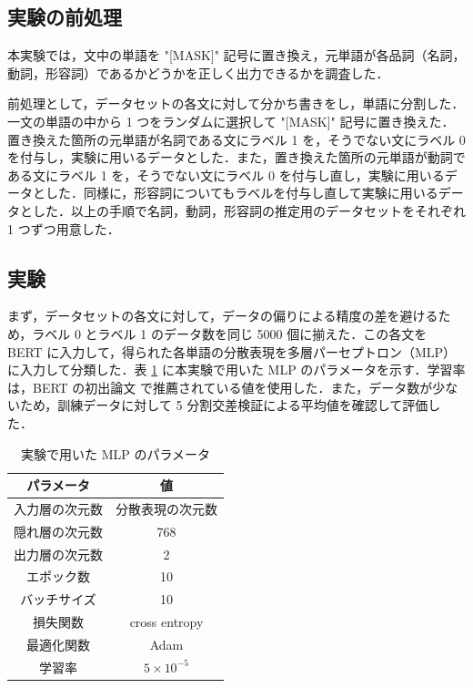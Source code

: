 \documentclass[twocolumn]{jarticle}
\begin{document}
  \subsection{実験の前処理}
本実験では，文中の単語を "[MASK]" 記号に置き換え，元単語が各品詞（名詞，動詞，形容詞）であるかどうかを正しく出力できるかを調査した．\par
前処理として，データセットの各文に対して分かち書きをし，単語に分割した．一文の単語の中から 1 つをランダムに選択して "[MASK]" 記号に置き換えた．置き換えた箇所の元単語が名詞である文にラベル 1 を，そうでない文にラベル 0 を付与し，実験に用いるデータとした．また，置き換えた箇所の元単語が動詞である文にラベル 1 を，そうでない文にラベル 0 を付与し直し，実験に用いるデータとした．同様に，形容詞についてもラベルを付与し直して実験に用いるデータとした．以上の手順で名詞，動詞，形容詞の推定用のデータセットをそれぞれ 1 つずつ用意した．\par

  \subsection{実験}
まず，データセットの各文に対して，データの偏りによる精度の差を避けるため，ラベル 0 とラベル 1 のデータ数を同じ 5000 個に揃えた．この各文を BERT に入力して，得られた各単語の分散表現を多層パーセプトロン（MLP）に入力して分類した．表 \ref{tb:1} に本実験で用いた MLP のパラメータを示す．学習率は，BERT の初出論文 \cite{DBLP} で推薦されている値を使用した．また，データ数が少ないため，訓練データに対して 5 分割交差検証による平均値を確認して評価した．


\begin{table}[t]
	\caption{実験で用いた MLP のパラメータ}
  \begin{center}
  \begin{tabular}{|c|c|} \hline
  パラメータ & 値  \\ \hline \hline
  入力層の次元数	& 分散表現の次元数 \\ %
  隠れ層の次元数	& 768 \\
  出力層の次元数	& 2 \\
  エポック数 & 10 \\
  バッチサイズ & 10 \\
  損失関数 & cross entropy \\
  最適化関数 & Adam \\
  学習率 & $5\times10^{-5}$ \\ \hline
	\end{tabular}
  \end{center}
	\label{tb:1}
\end{table}
\end{document}
